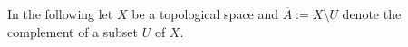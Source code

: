%
%



In the following let $X$ be a topological space and $\overline{A} := X\setminus U$ denote the complement of a subset $U$ of $X$.

